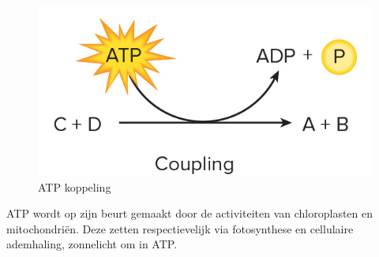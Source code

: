 \documentclass[a4paper,kul]{kulakarticle} %
\begin{document}
\begin{figure}[h]
	\centering
	\includegraphics[width=0.7\linewidth]{ATPCoupeling}
	\caption[ATP Koppeling]{ATP koppeling}
	\label{fig:atpcoupeling}
\end{figure}
ATP wordt op zijn beurt gemaakt door de activiteiten van chloroplasten en mitochondriën. Deze zetten respectievelijk via fotosynthese en cellulaire ademhaling, zonnelicht om in ATP. 
\end{document}
